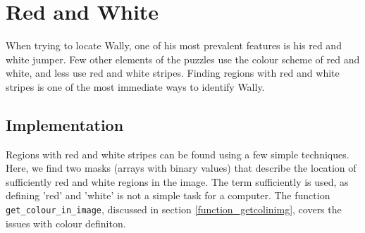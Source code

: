 \documentclass[../main.tex]{subfiles}
\begin{document}
\section{Red and White}
  When trying to locate Wally, one of his most prevalent features is his red and white jumper.
  Few other elements of the puzzles use the colour scheme of red and white, and less use red and white stripes.
  Finding regions with red and white stripes is one of the most immediate ways to identify Wally.

  \subsection{Implementation}
    Regions with red and white stripes can be found using a few simple techniques.
    Here, we find two masks (arrays with binary values) that describe the location of sufficiently red and white regions in the image.
    The term sufficiently is used, as defining 'red' and 'white' is not a simple task for a computer.
    The function \texttt{get\_colour\_in\_image}, discussed in section \ref{function_getcolinimg}, covers the issues with colour definiton.
\end{document}
